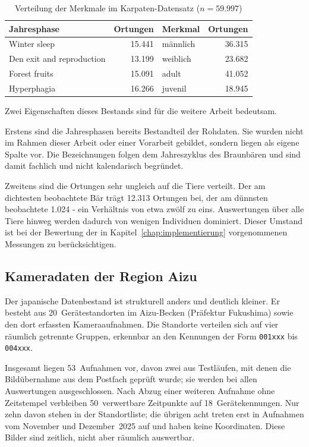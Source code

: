 \documentclass[12pt,a4paper]{report}
\begin{document}
\begin{table}[htbp]
\centering
\caption{Verteilung der Merkmale im Karpaten-Datensatz ($n = 59.997$)}
\label{tab:karpaten-merkmale}
\small
\begin{tabular}{l r l r}
\toprule
\textbf{Jahresphase} & \textbf{Ortungen} & \textbf{Merkmal} & \textbf{Ortungen} \\
\midrule
Winter sleep              & 15.441 & männlich  & 36.315 \\
Den exit and reproduction & 13.199 & weiblich  & 23.682 \\
Forest fruits             & 15.091 & adult     & 41.052 \\
Hyperphagia               & 16.266 & juvenil   & 18.945 \\
\bottomrule
\end{tabular}
\end{table}

Zwei Eigenschaften dieses Bestands sind für die weitere Arbeit bedeutsam.

Erstens sind die Jahresphasen bereits Bestandteil der Rohdaten. Sie wurden nicht im Rahmen
dieser Arbeit oder einer Vorarbeit gebildet, sondern liegen als eigene Spalte vor. Die
Bezeichnungen folgen dem Jahreszyklus des Braunbären und sind damit fachlich und nicht
kalendarisch begründet.

Zweitens sind die Ortungen sehr ungleich auf die Tiere verteilt. Der am dichtesten
beobachtete Bär trägt 12.313 Ortungen bei, der am dünnsten beobachtete 1.024 - ein
Verhältnis von etwa zwölf zu eins. Auswertungen über alle Tiere hinweg werden dadurch von
wenigen Individuen dominiert. Dieser Umstand ist bei der Bewertung der in
Kapitel~\ref{chap:implementierung} vorgenommenen Messungen zu berücksichtigen.



\subsection{Kameradaten der Region Aizu}
\label{subsec:japandaten}

Der japanische Datenbestand ist strukturell anders und deutlich kleiner. Er besteht aus
20~Gerätestandorten im Aizu-Becken (Präfektur Fukushima) sowie den dort erfassten
Kameraaufnahmen. Die Standorte verteilen sich auf vier räumlich getrennte Gruppen,
erkennbar an den Kennungen der Form \texttt{001xxx} bis \texttt{004xxx}.

Insgesamt liegen 53~Aufnahmen vor, davon zwei aus Testläufen, mit denen die Bildübernahme
aus dem Postfach geprüft wurde; sie werden bei allen Auswertungen ausgeschlossen. Nach Abzug einer weiteren Aufnahme ohne Zeitstempel
verbleiben 50~verwertbare Zeitpunkte auf 18~Gerätekennungen. Nur zehn davon stehen in der
Standortliste; die übrigen acht treten erst in Aufnahmen vom November und Dezember~2025 auf
und haben keine Koordinaten. Diese Bilder sind zeitlich, nicht aber räumlich auswertbar.
\end{document}
